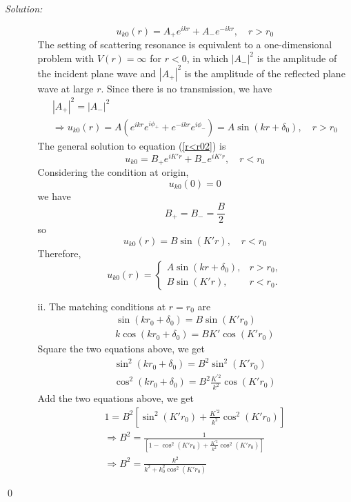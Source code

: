 \documentclass[10pt,a4paper]{article}
\newenvironment{sol}
    {\emph{Solution:}
    }
    {
    \qed
    }
\begin{document}
\begin{sol}
\begin{itemize}
\begin{itemize}
\begin{equation}
u_{k0}(r)=A_+e^{ikr}+A_-e^{-ikr},\quad r>r_0
\end{equation}
The setting of scattering resonance is equivalent to a one-dimensional problem with $V(r)=\infty$ for $r<0$, in which $|A_-|^2$ is the amplitude of the incident plane wave and $|A_+|^2$ is the amplitude of the reflected plane wave at large $r$. Since there is no transmission, we have
\begin{gather}
|A_+|^2=|A_-|^2\\
\Longrightarrow u_{k0}(r)=A(e^{ikr}e^{i\phi_+}+e^{-ikr}e^{i\phi_-})=A\sin(kr+\delta_0),\quad r>r_0
\end{gather}
The general solution to equation (\ref{r<r02}) is
\begin{equation}
u_{k0}=B_+e^{iK'r}+B_-e^{iK'r},\quad r<r_0
\end{equation}
Considering the condition at origin,
\begin{equation}
u_{k0}(0)=0
\end{equation}
we have
\begin{equation}
B_+=B_-=\frac{B}{2}
\end{equation}
so
\begin{equation}
u_{k0}(r)=B\sin(K'r),\quad r<r_0
\end{equation}
Therefore,
\begin{equation}
u_{k0}(r)=\left\{\begin{array}{ll}A\sin(kr+\delta_0),&r>r_0,\\B\sin(K'r),&r<r_0.\end{array}\right.
\end{equation}
\item[ii.] The matching conditions at $r=r_0$ are
\begin{gather}
\sin(kr_0+\delta_0)=B\sin(K'r_0)\\
k\cos(kr_0+\delta_0)=BK'\cos(K'r_0)
\end{gather}
Square the two equations above, we get
\begin{gather}
\sin^2(kr_0+\delta_0)=B^2\sin^2(K'r_0)\\
\cos^2(kr_0+\delta_0)=B^2\frac{K^{'2}}{k^2}\cos(K'r_0)
\end{gather}
Add the two equations above, we get
\begin{gather}
1=B^2\left[\sin^2(K'r_0)+\frac{K^{'2}}{k^2}\cos^2(K'r_0)\right]\\
\Longrightarrow B^2=\frac{1}{\left[1-\cos^2(K'r_0)+\frac{K^{'2}}{k^2}\cos^2(K'r_0)\right]}\\
\Longrightarrow B^2=\frac{k^2}{k^2+k_0^2\cos^2(K'r_0)}

\end{gather}
\end{itemize}
\end{itemize}
\end{sol}
\end{document}
